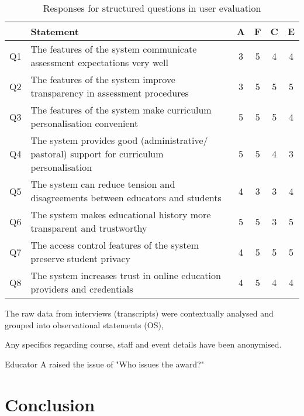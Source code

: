 \begin{table}[!ht]
	\caption{Responses for structured questions in user evaluation}
	\centering
	\label{table:structuredresp_eval}
	\begin{tabularx}{\textwidth}{|c|X|c|c|c|c|}
		\hline
		   & Statement                                                                & A                       & F                   & C                        & E                        \\
		\hline
		Q1 & The features of the system communicate assessment expectations very well & \cellcolor{Dandelion}3 & \cellcolor{green}5 & \cellcolor{SpringGreen}4 & \cellcolor{SpringGreen}4 \\
        \hline
        Q2 & The features of the system improve transparency in assessment procedures & \cellcolor{Dandelion}3 & \cellcolor{green}5 & \cellcolor{green}5 & \cellcolor{green}5 \\
        \hline
        Q3 & The features of the system make curriculum personalisation convenient & \cellcolor{green}5 & \cellcolor{green}5 & \cellcolor{green}5 & \cellcolor{SpringGreen}4 \\
        \hline
        Q4 & The system provides good (administrative/ pastoral) support for curriculum personalisation & \cellcolor{green}5 & \cellcolor{green}5 & \cellcolor{green}4 & \cellcolor{Dandelion}3 \\
        \hline
        Q5 & The system can reduce tension and disagreements between educators and students & \cellcolor{SpringGreen}4 & \cellcolor{Dandelion}3 & \cellcolor{Dandelion}3 & \cellcolor{SpringGreen}4 \\
        \hline
        Q6 & The system makes educational history more transparent and trustworthy & \cellcolor{green}5 & \cellcolor{green}5 & \cellcolor{Dandelion}3 & \cellcolor{green}5 \\
        \hline
        Q7 & The access control features of the system preserve student privacy & \cellcolor{SpringGreen}4 & \cellcolor{green}5 & \cellcolor{green}5 & \cellcolor{green}5 \\
        \hline
        Q8 & The system increases trust in online education providers and credentials & \cellcolor{SpringGreen}4 & \cellcolor{green}5 & \cellcolor{SpringGreen}4 & \cellcolor{SpringGreen}4 \\
        \hline
	\end{tabularx}
\end{table}



The raw data from interviews (transcripts) were contextually analysed and grouped into observational statements (OS),

Any specifics regarding course, staff and event details have been anonymised.

Educator A raised the issue of "Who issues the award?"

\section{Conclusion}